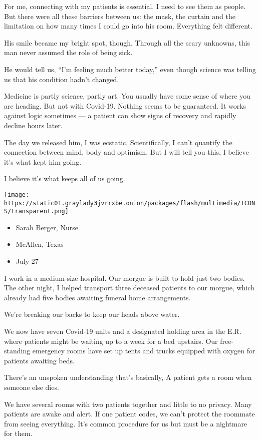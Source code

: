 For me, connecting with my patients is essential. I need to see them as
people. But there were all these barriers between us: the mask, the
curtain and the limitation on how many times I could go into his room.
Everything felt different.

His smile became my bright spot, though. Through all the scary unknowns,
this man never assumed the role of being sick.

He would tell us, ``I'm feeling much better today,'' even though science
was telling us that his condition hadn't changed.

Medicine is partly science, partly art. You usually have some sense of
where you are heading. But not with Covid-19. Nothing seems to be
guaranteed. It works against logic sometimes --- a patient can show
signs of recovery and rapidly decline hours later.

The day we released him, I was ecstatic. Scientifically, I can't
quantify the connection between mind, body and optimism. But I will tell
you this, I believe it's what kept him going.

I believe it's what keeps all of us going.

\texttt{[image: https://static01.graylady3jvrrxbe.onion/packages/flash/multimedia/ICONS/transparent.png]}

\begin{itemize}
\tightlist
\item
  Sarah Berger, Nurse
\item
  McAllen, Texas
\item
  July 27
\end{itemize}

I work in a medium-size hospital. Our morgue is built to hold just two
bodies. The other night, I helped transport three deceased patients to
our morgue, which already had five bodies awaiting funeral home
arrangements.

We're breaking our backs to keep our heads above water.

We now have seven Covid-19 units and a designated holding area in the
E.R. where patients might be waiting up to a week for a bed upstairs.
Our free-standing emergency rooms have set up tents and trucks equipped
with oxygen for patients awaiting beds.

There's an unspoken understanding that's basically, A patient gets a
room when someone else dies.

We have several rooms with two patients together and little to no
privacy. Many patients are awake and alert. If one patient codes, we
can't protect the roommate from seeing everything. It's common procedure
for us but must be a nightmare for them.

